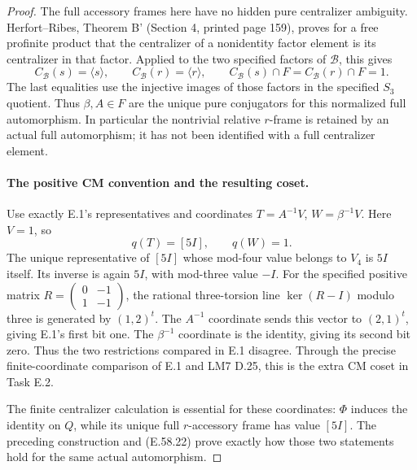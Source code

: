 \begin{proof}
The full accessory frames here have no hidden pure
centralizer ambiguity. Herfort--Ribes, Theorem B'
(Section 4, printed page 159), proves for a free
profinite product that the centralizer of a nonidentity
factor element is its centralizer in that factor.
Applied to the two specified factors of \(\mathcal B\),
this gives
\[
 C_{\mathcal B}(s)=\langle s\rangle,\qquad
 C_{\mathcal B}(r)=\langle r\rangle,
 \qquad C_{\mathcal B}(s)\cap F=C_{\mathcal B}(r)\cap F=1.
 \tag{E.58.22}
\]
The last equalities use the injective images of those
factors in the specified \(S_3\) quotient.
Thus \(\beta,A\in F\) are the unique pure conjugators
for this normalized full automorphism. In particular
the nontrivial relative \(r\)-frame is retained by
an actual full automorphism; it has not been identified
with a full centralizer element.\cite{BCHerfortRibes1985}

\paragraph{The positive CM convention and the resulting coset.}
Use exactly E.1's representatives and coordinates
\(T=A^{-1}V\), \(W=\beta^{-1}V\). Here \(V=1\), so
\[
 q(T)=[5I],\qquad q(W)=1.
 \tag{E.58.23}
\]
The unique representative of \([5I]\) whose mod-four
value belongs to \(V_4\) is \(5I\) itself.
Its inverse is again \(5I\), with mod-three value
\(-I\). For the specified positive matrix
\(R=\left(\begin{smallmatrix}0&-1\\1&-1\end{smallmatrix}\right)\),
the rational three-torsion line \(\ker(R-I)\) modulo
three is generated by \((1,2)^t\). The \(A^{-1}\)
coordinate sends this vector to \((2,1)^t\), giving
E.1's first bit one. The \(\beta^{-1}\) coordinate
is the identity, giving its second bit zero.
Thus the two restrictions compared in E.1 disagree.
Through the precise finite-coordinate comparison of
E.1 and LM7 D.25, this is the extra CM coset in Task E.2.

The finite centralizer calculation is essential for
these coordinates: \(\Phi\) induces the identity on
\(Q\), while its unique full \(r\)-accessory frame
has value \([5I]\). The preceding construction and
\textup{(E.58.22)} prove exactly how those two statements
hold for the same actual automorphism.


\end{proof}
